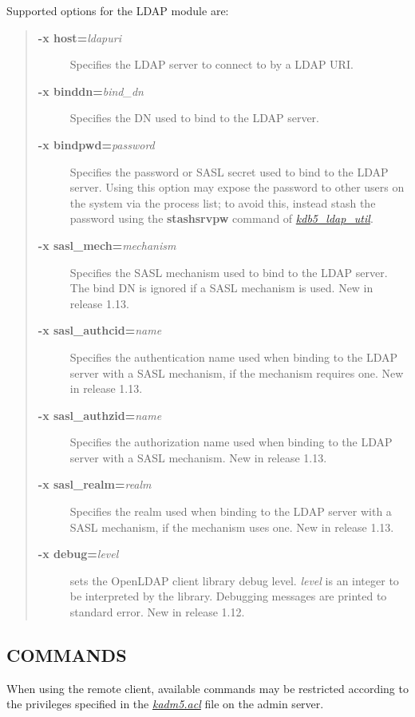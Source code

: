 \documentclass[letterpaper,10pt,english]{sphinxmanual}
\begin{document}
Supported options for the LDAP module are:
\begin{quote}
\begin{description}
\item[{\textbf{-x host=}\emph{ldapuri}}] \leavevmode
Specifies the LDAP server to connect to by a LDAP URI.

\item[{\textbf{-x binddn=}\emph{bind\_dn}}] \leavevmode
Specifies the DN used to bind to the LDAP server.

\item[{\textbf{-x bindpwd=}\emph{password}}] \leavevmode
Specifies the password or SASL secret used to bind to the LDAP
server.  Using this option may expose the password to other
users on the system via the process list; to avoid this,
instead stash the password using the \textbf{stashsrvpw} command of
{\hyperref[admin/admin_commands/kdb5_ldap_util:kdb5-ldap-util-8]{\emph{kdb5\_ldap\_util}}}.

\item[{\textbf{-x sasl\_mech=}\emph{mechanism}}] \leavevmode
Specifies the SASL mechanism used to bind to the LDAP server.
The bind DN is ignored if a SASL mechanism is used.  New in
release 1.13.

\item[{\textbf{-x sasl\_authcid=}\emph{name}}] \leavevmode
Specifies the authentication name used when binding to the
LDAP server with a SASL mechanism, if the mechanism requires
one.  New in release 1.13.

\item[{\textbf{-x sasl\_authzid=}\emph{name}}] \leavevmode
Specifies the authorization name used when binding to the LDAP
server with a SASL mechanism.  New in release 1.13.

\item[{\textbf{-x sasl\_realm=}\emph{realm}}] \leavevmode
Specifies the realm used when binding to the LDAP server with
a SASL mechanism, if the mechanism uses one.  New in release
1.13.

\item[{\textbf{-x debug=}\emph{level}}] \leavevmode
sets the OpenLDAP client library debug level.  \emph{level} is an
integer to be interpreted by the library.  Debugging messages
are printed to standard error.  New in release 1.12.

\end{description}
\end{quote}


\subsection{COMMANDS}
\label{admin/admin_commands/kadmin_local:commands}
When using the remote client, available commands may be restricted
according to the privileges specified in the {\hyperref[admin/conf_files/kadm5_acl:kadm5-acl-5]{\emph{kadm5.acl}}} file
on the admin server.
\end{document}
